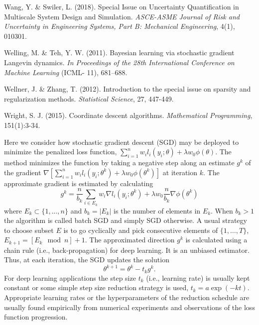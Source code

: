 \documentclass[12pt]{TD-CJS}
\begin{document}
\begin{thebibliography}{}
Wang, Y. \& Swiler, L. (2018). Special Issue on Uncertainty Quantification in Multiscale System Design and Simulation.
{\it ASCE-ASME Journal of Risk and Uncertainty in Engineering Systems, Part B: Mechanical Engineering}, 4(1), 010301.

Welling, M. \& Teh, Y. W. (2011). Bayesian learning via stochastic gradient Langevin dynamics. {\it In Proceedings of the 28th International Conference on Machine Learning} (ICML- 11), 681--688.

 Wellner, J. \& Zhang, T. (2012). 
Introduction to the special issue on sparsity and regularization methods. 
{\em Statistical Science}, 27, 447-449.


Wright, S. J. (2015).  Coordinate descent algorithms. {\it Mathematical Programming},  151(1):3-34.
\end{thebibliography}

\begin{appendix}\label{SGD}
Here we consider how stochastic gradient descent (SGD) may be deployed to
  minimize the penalized loss function, $\sum_{i=1}^n w_i l_i(y_i; \theta) + \lambda w_{0} \phi(\theta)$. The method minimizes the function by taking a negative step along an estimate $g^k$ of the gradient $\nabla\left[\sum_{i=1}^n w_i l_i(y_i; \theta^k) + \lambda w_{0} \phi(\theta^k)\right] $ at iteration $k$. 
The approximate gradient is estimated by calculating 
\[
g^k = \frac{n}{b_k} \sum_{i \in E_k} w_i\nabla  l_i(y_i; \theta^k) +  \lambda w_{0} \frac{n}{b_k}\nabla \phi(\theta^k)
\]
where $E_k \subset \{1,\ldots,n \}$ and $b_k = |E_k|$ is the number of elements in $E_k$. When $b_k >1$ the algorithm is called batch SGD and simply SGD otherwise. A usual strategy to choose subset $E$ is to go cyclically and pick consecutive elements of $\{1,\ldots,T \}$, $E_{k+1} = [E_k \mod n]+1$. The approximated direction  $g^k$ is calculated using a 
chain rule (i.e., back-propagation) for deep learning. It  is an unbiased estimator. Thus, at each iteration, the SGD updates the solution
\[
\theta^{k+1} = \theta^k - t_k g^k.
\]
For deep learning applications the step size $t_k$ (i.e., learning rate) is usually kept constant or some simple step size reduction strategy is used, $t_k = a\exp(-kt)$. Appropriate learning rates or the hyperparameters of the reduction schedule  are usually found empirically from numerical experiments and observations of the loss function progression. \\
\end{appendix}
\end{document}
